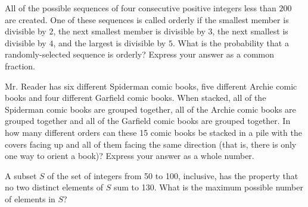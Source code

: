 \documentclass[9pt]{beamer}
\begin{document}
\begin{frame}[t]{6.1}
\begin{block}{}
     All of the possible sequences of four consecutive positive integers less than $200$ are created. One of these sequences is called orderly if the smallest member is divisible by $2$, the next smallest member is divisible by $3$, the next smallest is divisible by $4$, and the largest is divisible by $5.$ What is the probability that a randomly-selected sequence is orderly? Express your answer as a common fraction.
\end{block}
\end{frame}

\begin{frame}[t]{6.2}
\begin{block}{}
    Mr. Reader has six different Spiderman comic books, five different Archie comic books and four different Garfield comic books. When stacked, all of the Spiderman comic books are grouped together, all of the Archie comic books are grouped together and all of the Garfield comic books are grouped together. In how many different orders can these 15 comic books be stacked in a pile with the covers facing up and all of them facing the same direction (that is, there is only one way to orient a book)? Express your answer as a whole number.
\end{block}
\end{frame}

\begin{frame}[t]{6.3}
\begin{block}{}
    A subset $S$ of the set of integers from 50 to 100, inclusive, has the property that no two distinct elements of $S$ sum to 130. What is the maximum possible number of elements in $S$?
\end{block}
\end{frame}
\end{document}
